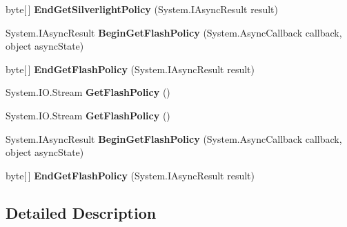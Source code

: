 \begin{DoxyCompactItemize}
\item 
\hypertarget{interface_i_cross_domain_policy_responder_addab78f9533b2b39f5c719b8151fbac8}{
byte\mbox{[}$\,$\mbox{]} {\bfseries EndGetSilverlightPolicy} (System.IAsyncResult result)}
\label{interface_i_cross_domain_policy_responder_addab78f9533b2b39f5c719b8151fbac8}

\item 
\hypertarget{interface_i_cross_domain_policy_responder_abab519110ad26fe6221efc166e30e5c3}{
System.IAsyncResult {\bfseries BeginGetFlashPolicy} (System.AsyncCallback callback, object asyncState)}
\label{interface_i_cross_domain_policy_responder_abab519110ad26fe6221efc166e30e5c3}

\item 
\hypertarget{interface_i_cross_domain_policy_responder_a0b37154e9f138d5a6e9026139895d871}{
byte\mbox{[}$\,$\mbox{]} {\bfseries EndGetFlashPolicy} (System.IAsyncResult result)}
\label{interface_i_cross_domain_policy_responder_a0b37154e9f138d5a6e9026139895d871}

\item 
\hypertarget{interface_i_cross_domain_policy_responder_a5e70f8cd1ae8c4d6793bf86c42a61794}{
System.IO.Stream {\bfseries GetFlashPolicy} ()}
\label{interface_i_cross_domain_policy_responder_a5e70f8cd1ae8c4d6793bf86c42a61794}

\item 
\hypertarget{interface_i_cross_domain_policy_responder_a5e70f8cd1ae8c4d6793bf86c42a61794}{
System.IO.Stream {\bfseries GetFlashPolicy} ()}
\label{interface_i_cross_domain_policy_responder_a5e70f8cd1ae8c4d6793bf86c42a61794}

\item 
\hypertarget{interface_i_cross_domain_policy_responder_abab519110ad26fe6221efc166e30e5c3}{
System.IAsyncResult {\bfseries BeginGetFlashPolicy} (System.AsyncCallback callback, object asyncState)}
\label{interface_i_cross_domain_policy_responder_abab519110ad26fe6221efc166e30e5c3}

\item 
\hypertarget{interface_i_cross_domain_policy_responder_a0b37154e9f138d5a6e9026139895d871}{
byte\mbox{[}$\,$\mbox{]} {\bfseries EndGetFlashPolicy} (System.IAsyncResult result)}
\label{interface_i_cross_domain_policy_responder_a0b37154e9f138d5a6e9026139895d871}

\end{DoxyCompactItemize}


\subsection{Detailed Description}


